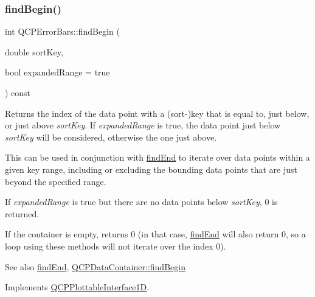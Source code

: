 \mbox{\label{class_q_c_p_error_bars_a5c74b510f1d7254263ec18cd3a359a07}} 
\subsubsection{\texorpdfstring{find\+Begin()}{findBegin()}}
{\footnotesize\ttfamily int Q\+C\+P\+Error\+Bars\+::find\+Begin (\begin{DoxyParamCaption}\item[{double}]{sort\+Key,  }\item[{bool}]{expanded\+Range = {\ttfamily true} }\end{DoxyParamCaption}) const\hspace{0.3cm}{\ttfamily [virtual]}}

Returns the index of the data point with a (sort-\/)key that is equal to, just below, or just above {\itshape sort\+Key}. If {\itshape expanded\+Range} is true, the data point just below {\itshape sort\+Key} will be considered, otherwise the one just above.

This can be used in conjunction with \hyperlink{class_q_c_p_error_bars_a64629f13bb290d41dd8f1b37346bfdd4}{find\+End} to iterate over data points within a given key range, including or excluding the bounding data points that are just beyond the specified range.

If {\itshape expanded\+Range} is true but there are no data points below {\itshape sort\+Key}, 0 is returned.

If the container is empty, returns 0 (in that case, \hyperlink{class_q_c_p_error_bars_a64629f13bb290d41dd8f1b37346bfdd4}{find\+End} will also return 0, so a loop using these methods will not iterate over the index 0).

\begin{DoxySeeAlso}{See also}
\hyperlink{class_q_c_p_error_bars_a64629f13bb290d41dd8f1b37346bfdd4}{find\+End}, \hyperlink{class_q_c_p_data_container_a2ad8a5399072d99a242d3a6d2d7e278a}{Q\+C\+P\+Data\+Container\+::find\+Begin} 
\end{DoxySeeAlso}


Implements \hyperlink{class_q_c_p_plottable_interface1_d_a5b95783271306a4de97be54eac1e7d13}{Q\+C\+P\+Plottable\+Interface1D}.

\mbox{\label{class_q_c_p_error_bars_a64629f13bb290d41dd8f1b37346bfdd4}} 
